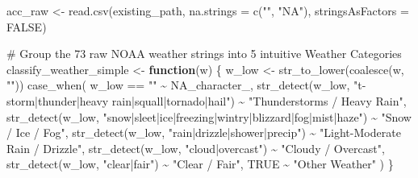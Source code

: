 \documentclass[
  letterpaper,
  DIV=11,
  numbers=noendperiod]{scrartcl}
\newenvironment{Shaded}{\begin{snugshade}}{\end{snugshade}}
\newcommand{\AttributeTok}[1]{\textcolor[rgb]{0.40,0.45,0.13}{#1}}
\newcommand{\CommentTok}[1]{\textcolor[rgb]{0.37,0.37,0.37}{#1}}
\newcommand{\ConstantTok}[1]{\textcolor[rgb]{0.56,0.35,0.01}{#1}}
\newcommand{\ControlFlowTok}[1]{\textcolor[rgb]{0.00,0.23,0.31}{\textbf{#1}}}
\newcommand{\FunctionTok}[1]{\textcolor[rgb]{0.28,0.35,0.67}{#1}}
\newcommand{\NormalTok}[1]{\textcolor[rgb]{0.00,0.23,0.31}{#1}}
\newcommand{\OtherTok}[1]{\textcolor[rgb]{0.00,0.23,0.31}{#1}}
\newcommand{\SpecialCharTok}[1]{\textcolor[rgb]{0.37,0.37,0.37}{#1}}
\newcommand{\StringTok}[1]{\textcolor[rgb]{0.13,0.47,0.30}{#1}}
\begin{document}
\begin{Shaded}
\begin{Highlighting}[]
\NormalTok{acc\_raw }\OtherTok{\textless{}{-}} \FunctionTok{read.csv}\NormalTok{(existing\_path, }\AttributeTok{na.strings =} \FunctionTok{c}\NormalTok{(}\StringTok{""}\NormalTok{, }\StringTok{"NA"}\NormalTok{), }\AttributeTok{stringsAsFactors =} \ConstantTok{FALSE}\NormalTok{)}

\CommentTok{\# Group the 73 raw NOAA weather strings into 5 intuitive Weather Categories}
\NormalTok{classify\_weather\_simple }\OtherTok{\textless{}{-}} \ControlFlowTok{function}\NormalTok{(w) \{}
\NormalTok{  w\_low }\OtherTok{\textless{}{-}} \FunctionTok{str\_to\_lower}\NormalTok{(}\FunctionTok{coalesce}\NormalTok{(w, }\StringTok{""}\NormalTok{))}
  \FunctionTok{case\_when}\NormalTok{(}
\NormalTok{    w\_low }\SpecialCharTok{==} \StringTok{""} \SpecialCharTok{\textasciitilde{}} \ConstantTok{NA\_character\_}\NormalTok{,}
    \FunctionTok{str\_detect}\NormalTok{(w\_low, }\StringTok{"t{-}storm|thunder|heavy rain|squall|tornado|hail"}\NormalTok{) }\SpecialCharTok{\textasciitilde{}} \StringTok{"Thunderstorms / Heavy Rain"}\NormalTok{,}
    \FunctionTok{str\_detect}\NormalTok{(w\_low, }\StringTok{"snow|sleet|ice|freezing|wintry|blizzard|fog|mist|haze"}\NormalTok{) }\SpecialCharTok{\textasciitilde{}} \StringTok{"Snow / Ice / Fog"}\NormalTok{,}
    \FunctionTok{str\_detect}\NormalTok{(w\_low, }\StringTok{"rain|drizzle|shower|precip"}\NormalTok{) }\SpecialCharTok{\textasciitilde{}} \StringTok{"Light{-}Moderate Rain / Drizzle"}\NormalTok{,}
    \FunctionTok{str\_detect}\NormalTok{(w\_low, }\StringTok{"cloud|overcast"}\NormalTok{) }\SpecialCharTok{\textasciitilde{}} \StringTok{"Cloudy / Overcast"}\NormalTok{,}
    \FunctionTok{str\_detect}\NormalTok{(w\_low, }\StringTok{"clear|fair"}\NormalTok{) }\SpecialCharTok{\textasciitilde{}} \StringTok{"Clear / Fair"}\NormalTok{,}
    \ConstantTok{TRUE} \SpecialCharTok{\textasciitilde{}} \StringTok{"Other Weather"}
\NormalTok{  )}
\NormalTok{\}}


\end{Highlighting}
\end{Shaded}
\end{document}
